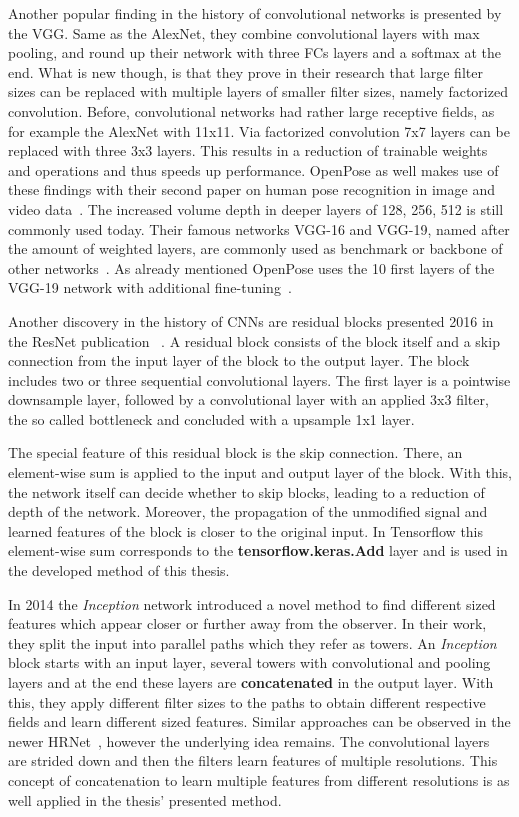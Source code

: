 Another popular finding in the history of convolutional networks is presented by the \gls{VGG}.
Same as the AlexNet, they combine convolutional layers with max pooling, and round up their network with
three \glspl{FC} layers and a softmax at the end.
What is new though, is that they prove in their research that large filter sizes can be replaced with multiple layers of smaller filter sizes, namely
factorized convolution.
Before, convolutional networks had rather large receptive fields, as for example the AlexNet with 11x11.
Via factorized convolution 7x7 layers can be replaced with three 3x3 layers.
This results in a reduction of trainable weights and operations and thus speeds up performance.
OpenPose as well makes use of these findings with their second paper on human pose recognition in image and video data~\cite{openpose}.
The increased volume depth in deeper layers of 128, 256, 512 is still commonly used today.
Their famous networks VGG-16 and VGG-19, named after the amount of weighted layers, are commonly used as benchmark or
backbone of other networks~\cite{advanceddeeplearningpython}.
As already mentioned OpenPose uses the 10 first layers of the VGG-19 network with additional fine-tuning~\cite{openpose}.

Another discovery in the history of \glspl{CNN} are residual blocks presented 2016 in the ResNet publication ~\cite{resnet}.
A residual block consists of the block itself and a skip connection from the input layer of the block to the output layer.
The block includes two or three sequential convolutional layers. The first layer is a pointwise downsample layer,
followed by a convolutional layer with an applied 3x3 filter, the so called bottleneck and concluded with a upsample 1x1 layer.

The special feature of this residual block is the skip connection.
There, an element-wise sum is applied to the input and
output layer of the block.
With this, the network itself can decide whether to skip blocks, leading to a reduction of depth of the network.
Moreover, the propagation of the unmodified signal and learned features
of the block is closer to the original input.
In Tensorflow this element-wise sum corresponds to the \textbf{tensorflow.keras.Add} layer and is used in the developed
method of this thesis.

In 2014 the \textit{Inception} network introduced a novel method to find different sized features which appear closer or
further away from the observer.
In their work, they split the input into parallel paths which they refer as towers.
An \textit{Inception} block starts with an input layer, several towers with convolutional and pooling layers and at the end
these layers are \textbf{concatenated} in the output layer.
With this, they apply different filter sizes to the paths to obtain different respective fields and learn different sized features.
Similar approaches can be observed in the newer HRNet~\cite{HRNetv2}, however the underlying idea remains.
The convolutional layers are strided down and then the filters learn features of multiple resolutions.
This concept of concatenation to learn multiple features from different resolutions is as well applied in the thesis'
presented method.

